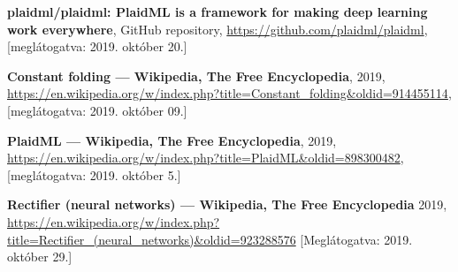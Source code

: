 \begin{thebibliography}{9}
	\textbf{plaidml/plaidml: PlaidML is a framework for making deep learning work everywhere},
	GitHub repository,
	\newline\url{https://github.com/plaidml/plaidml},
	[meglátogatva: 2019. október 20.]
	
	
	\textbf{Constant folding --- {Wikipedia}{,} The Free Encyclopedia},
	2019,
	\newline\url{https://en.wikipedia.org/w/index.php?title=Constant_folding&oldid=914455114},
	[meglátogatva: 2019. október 09.]
	
	\textbf{PlaidML --- {Wikipedia}{,} The Free Encyclopedia},
	2019,
	\newline\url{https://en.wikipedia.org/w/index.php?title=PlaidML&oldid=898300482},
	[meglátogatva: 2019. október 5.]
	
	\textbf{Rectifier (neural networks) --- {Wikipedia}{,} The Free Encyclopedia}
	2019,
	\newline\url{ https://en.wikipedia.org/w/index.php?title=Rectifier_(neural_networks)&oldid=923288576}
	[Meglátogatva: 2019. október 29.]
\end{thebibliography}